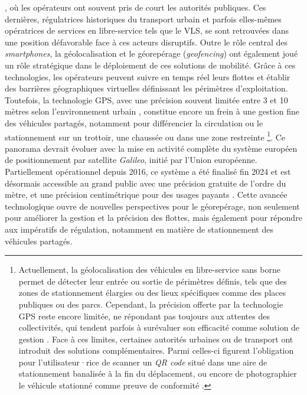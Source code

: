 \begin{refsegment}
{}, où les opérateurs ont souvent pris de court les autorités publiques. Ces dernières, régulatrices historiques du transport urbain et parfois elles-mêmes opératrices de services en libre-service tels que le \acrshort{VLS}, se sont retrouvées dans une position défavorable face à ces acteurs disruptifs. Outre le rôle central des \textsl{smartphones}, la géolocalisation et le géorepérage (\textsl{geofencing}) ont également joué un rôle stratégique dans le déploiement de ces solutions de mobilité. Grâce à ces technologies, les opérateurs peuvent suivre en temps réel leurs flottes et établir des barrières géographiques virtuelles définissant les périmètres d’exploitation. Toutefois, la technologie \acrshort{GPS}, avec une précision souvent limitée entre 3 et 10 mètres selon l’environnement urbain \textcolor{blue}{\autocite{the_scooterist_dockless_2020}}, constitue encore un frein à une gestion fine des véhicules partagés, notamment pour différencier la circulation ou le stationnement sur un trottoir, une chaussée ou dans une zone restreinte \textcolor{blue}{\autocite[96]{6t-bureau_de_recherche_livre_2019}}\footnote{
    Actuellement, la géolocalisation des véhicules en libre-service sans borne permet de détecter leur entrée ou sortie de périmètres définis, tels que des zones de stationnement élargies ou des lieux spécifiques comme des places publiques ou des parcs. Cependant, la précision offerte par la technologie \acrshort{GPS} reste encore limitée, ne répondant pas toujours aux attentes des collectivités, qui tendent parfois à surévaluer son efficacité comme solution de gestion \textcolor{blue}{\autocite[123]{6t-bureau_de_recherche_livre_2019}}. Face à ces limites, certaines autorités urbaines ou de transport ont introduit des solutions complémentaires. Parmi celles-ci figurent l’obligation pour l’utilisateur·rice de scanner un \textsl{QR code} situé dans une aire de stationnement banalisée à la fin du déplacement, ou encore de photographier le véhicule stationné comme preuve de conformité \textcolor{blue}{\autocite[96]{6t-bureau_de_recherche_livre_2019}}.
}. Ce panorama devrait évoluer avec la mise en activité complète du système européen de positionnement par satellite \textsl{Galileo}, initié par l’Union européenne. Partiellement opérationnel depuis 2016, ce système a été finalisé fin 2024 et est désormais accessible au grand public avec une précision gratuite de l’ordre du mètre, et une précision centimétrique pour des usages payants \textcolor{blue}{\autocite{futura_sciences_galileo_2019}}. Cette avancée technologique ouvre de nouvelles perspectives pour le géorepérage, non seulement pour améliorer la gestion et la précision des flottes, mais également pour répondre aux impératifs de régulation, notamment en matière de stationnement des véhicules partagés.%
 

\end{refsegment}
